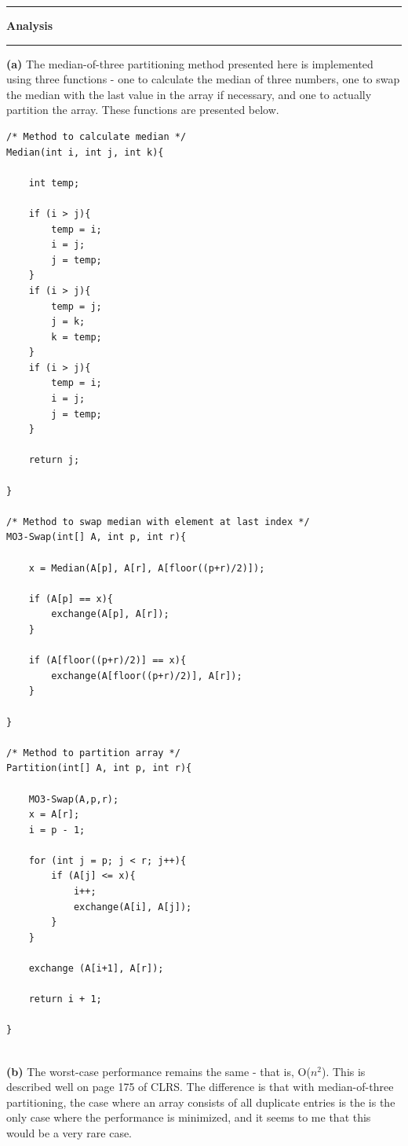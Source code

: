 \documentclass[11pt]{article}
\newcommand\question[2]{\vspace{.25in}\hrule\textbf{#1 #2}\vspace{.5em}\hrule\vspace{.10in}}
\renewcommand\part[1]{\vspace{.10in}\textbf{(#1)}}
\begin{document}
\raggedright
\newcommand\NAME{Sean Connor (443-414-5111)}  %
\newcommand\HWNUM{ PA2}              %
\question{Analysis}{}
\part{a} 
The median-of-three partitioning method presented here is implemented using three functions - one to calculate the median of three numbers, one to swap the median with the last value in the array if necessary, and one to actually partition the array. These functions are presented below.
\begin{lstlisting}
/* Method to calculate median */
Median(int i, int j, int k){
	
	int temp;
	
	if (i > j){
		temp = i;
		i = j;
		j = temp;
	}
	if (i > j){
		temp = j;
		j = k;
		k = temp;
	}
	if (i > j){
		temp = i;
		i = j;
		j = temp;
	}
	
	return j;
	
}

/* Method to swap median with element at last index */
MO3-Swap(int[] A, int p, int r){
	
	x = Median(A[p], A[r], A[floor((p+r)/2)]);
	
	if (A[p] == x){
		exchange(A[p], A[r]);
	}
	
	if (A[floor((p+r)/2)] == x){
		exchange(A[floor((p+r)/2)], A[r]);
	}	
	
}

/* Method to partition array */
Partition(int[] A, int p, int r){
	
	MO3-Swap(A,p,r);
	x = A[r];
	i = p - 1;
	
	for (int j = p; j < r; j++){
		if (A[j] <= x){
			i++;
			exchange(A[i], A[j]);
		}
	}
	
	exchange (A[i+1], A[r]);
	
	return i + 1;
	
}
	
\end{lstlisting}

\part{b}
The worst-case performance remains the same - that is, O($n^2$). This is described well on page 175 of CLRS. The difference is that with median-of-three partitioning, the case where an array consists of all duplicate entries is the is the only case where the performance is minimized, and it seems to me that this would be a very rare case. 
\end{document}
